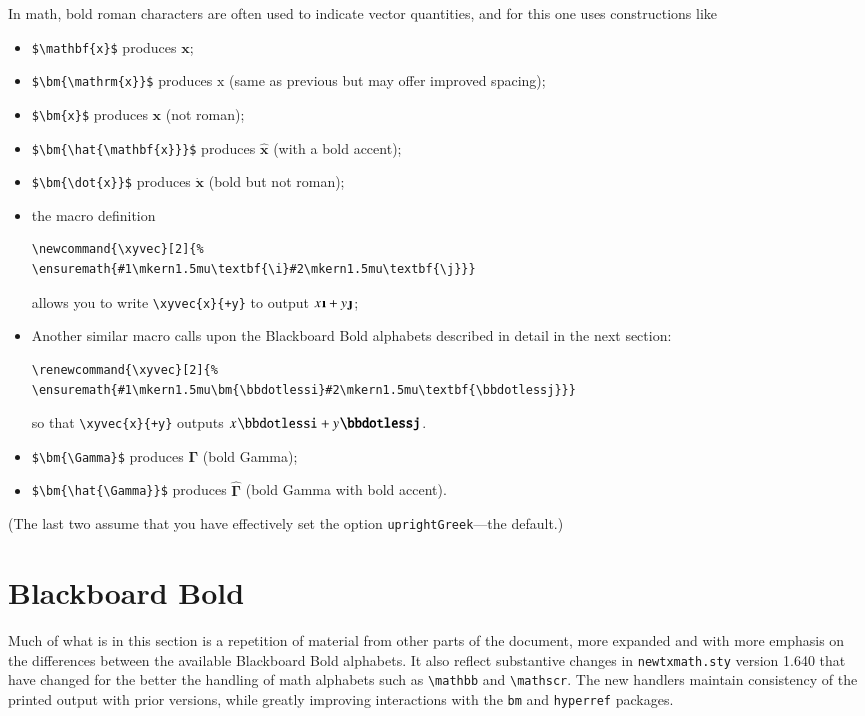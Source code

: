 \documentclass[\fsc]{article}
\theoremstyle{oldplain}
\theoremstyle{plain}
\begin{document}
In math, bold roman characters are often used to indicate vector quantities, and for this one uses constructions like 
\begin{itemize}
\item
\verb|$\mathbf{x}$| produces $\mathbf{x}$;
\item
\verb|$\bm{\mathrm{x}}$| produces $\bm{\mathrm{x}}$ (same as previous but may offer improved spacing);
\item
\verb|$\bm{x}$| produces $\bm{x}$ (not roman);
\item
\verb|$\bm{\hat{\mathbf{x}}}$| produces $\bm{\hat{\mathbf{x}}}$ (with a bold accent);
\item \verb|$\bm{\dot{x}}$| produces $\bm{\dot{x}}$ (bold but not roman);
\item the macro definition
\newcommand{\xyvec}[2]{%
\ensuremath{#1\mkern1.5mu\textbf{\i}#2\mkern1.5mu\textbf{\j}}}
\begin{verbatim}
\newcommand{\xyvec}[2]{%
\ensuremath{#1\mkern1.5mu\textbf{\i}#2\mkern1.5mu\textbf{\j}}}
\end{verbatim}
allows you to write \verb|\xyvec{x}{+y}| to output $\xyvec{x}{+y}$;
\item Another similar macro calls upon the Blackboard Bold alphabets described in detail in the next section:
\renewcommand{\xyvec}[2]{%
\ensuremath{#1\mkern1.5mu\bm{\bbdotlessi}#2\mkern1.5mu\textbf{\bbdotlessj}}}
\begin{verbatim}
\renewcommand{\xyvec}[2]{%
\ensuremath{#1\mkern1.5mu\bm{\bbdotlessi}#2\mkern1.5mu\textbf{\bbdotlessj}}}
\end{verbatim}
so that  \verb|\xyvec{x}{+y}| outputs $\xyvec{x}{+y}$.
\item \verb|$\bm{\Gamma}$| produces $\bm{\Gamma}$ (bold Gamma);
\item \verb|$\bm{\hat{\Gamma}}$| produces $\bm{\hat{\Gamma}}$ (bold Gamma with bold accent).
\end{itemize}
(The last two assume that you have effectively set the option {\tt uprightGreek}---the default.)

\section{Blackboard Bold}
Much of what is in this section is a repetition of material from other parts of the document, more expanded and with more emphasis on the differences between the available Blackboard Bold alphabets. It also reflect substantive changes  in {\tt newtxmath.sty} version 1.640 that have changed for the better  the handling of math alphabets such as \verb|\mathbb| and \verb|\mathscr|. The new handlers maintain consistency of the printed output with prior versions, while greatly improving interactions with the {\tt bm} and {\tt hyperref} packages.
\end{document}
